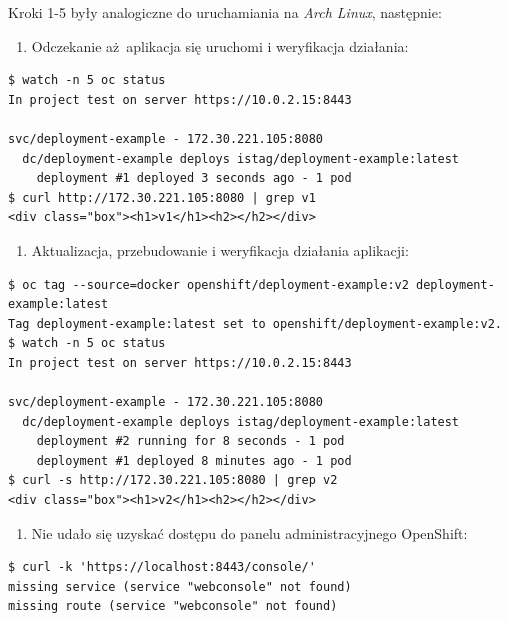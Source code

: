 \documentclass[a4paper,12pt,twoside,openany]{report}
\providecommand{\tightlist}{%
  \setlength{\itemsep}{0pt}\setlength{\parskip}{0pt}}
\begin{document}
Kroki 1-5 były analogiczne do uruchamiania na \emph{Arch Linux},
następnie:

\begin{enumerate}
\def\labelenumi{\arabic{enumi}.}
\setcounter{enumi}{5}
\tightlist
\item
  Odczekanie aż~aplikacja się uruchomi i weryfikacja działania:
\end{enumerate}

\begin{lstlisting}
$ watch -n 5 oc status
In project test on server https://10.0.2.15:8443

svc/deployment-example - 172.30.221.105:8080
  dc/deployment-example deploys istag/deployment-example:latest 
    deployment #1 deployed 3 seconds ago - 1 pod
$ curl http://172.30.221.105:8080 | grep v1
<div class="box"><h1>v1</h1><h2></h2></div>
\end{lstlisting}

\begin{enumerate}
\def\labelenumi{\arabic{enumi}.}
\setcounter{enumi}{6}
\tightlist
\item
  Aktualizacja, przebudowanie i weryfikacja działania aplikacji:
\end{enumerate}

\begin{lstlisting}
$ oc tag --source=docker openshift/deployment-example:v2 deployment-example:latest
Tag deployment-example:latest set to openshift/deployment-example:v2.
$ watch -n 5 oc status
In project test on server https://10.0.2.15:8443

svc/deployment-example - 172.30.221.105:8080
  dc/deployment-example deploys istag/deployment-example:latest 
    deployment #2 running for 8 seconds - 1 pod
    deployment #1 deployed 8 minutes ago - 1 pod
$ curl -s http://172.30.221.105:8080 | grep v2
<div class="box"><h1>v2</h1><h2></h2></div>
\end{lstlisting}

\begin{enumerate}
\def\labelenumi{\arabic{enumi}.}
\setcounter{enumi}{7}
\tightlist
\item
  Nie udało się uzyskać dostępu do panelu administracyjnego OpenShift:
\end{enumerate}

\begin{lstlisting}
$ curl -k 'https://localhost:8443/console/'
missing service (service "webconsole" not found)
missing route (service "webconsole" not found)
\end{lstlisting}
\end{document}
